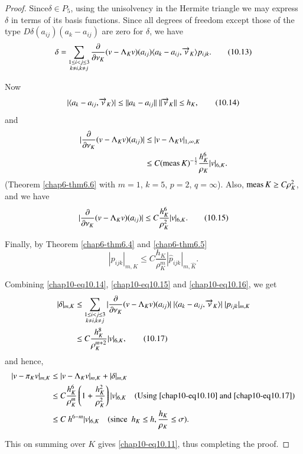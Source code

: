 \begin{proof}
Since\pageoriginale $\delta\in P_{5}$, using the unisolvency in the
Hermite triangle we may express $\delta$ in terms of its basis
functions. Since all degrees of freedom except those of the type
$D\delta(a_{ij})(a_{k}-a_{ij})$ are zero for $\delta$, we have
\begin{equation*}
\delta=\sum_{\substack{1\leq i<j\leq 3\\ k\neq i, k\neq
    j}}\frac{\partial}{\partial \nu_{K}}(v-\Lambda_{K}v)(a_{ij})\langle
a_{k}-a_{ij},\overrightarrow{\nu}_{K}\rangle p_{ijk}.\tag{10.13}\label{chap10-eq10.13}
\end{equation*}

Now 
\begin{equation*}
|\langle a_{k}-a_{ij},\overrightarrow{\nu}_{K}\rangle |\leq
||a_{k}-a_{ij}||~||\overrightarrow{\nu}_{K}||\leq h_{K},\tag{10.14}\label{chap10-eq10.14}
\end{equation*}
and
\begin{align*}
|\frac{\partial}{\partial \nu_{K}}(v-\Lambda_{K}v)(a_{ij})| &\leq
|v-\Lambda_{K}v|_{1,\infty,K}\\ 
&\leq C(\operatorname{meas} K)^{-\frac{1}{2}}\frac{h^{6}_{K}}{\rho_{K}}|v|_{6,K}. 
\end{align*}
(Theorem \ref{chap6-thm6.6} with $m=1$, $k=5$, $p=2$,
$q=\infty$). Also, $\operatorname{meas} K\geq C\rho^{2}_{K}$, and we have
\begin{equation*}
|\frac{\partial}{\partial \nu_{K}}(v-\Lambda_{K}v)(a_{ij})|\leq
C\frac{h^{6}_{K}}{\rho^{2}_{K}}|v|_{6,K}.\tag{10.15}\label{chap10-eq10.15} 
\end{equation*}

Finally, by Theorem \ref{chap6-thm6.4} and \ref{chap6-thm6.5}
\begin{equation*}
|p_{ijk}|_{m,K}\leq
C\frac{h_{K}}{\rho^{m}_{K}}|\hat{p}_{ijk}|_{m,\hat{K}}.\tag{10.16}\label{chap10-eq10.16} 
\end{equation*}

Combining \eqref{chap10-eq10.14}, \eqref{chap10-eq10.15} and
\eqref{chap10-eq10.16}, we get
\begin{align*}
|\delta|_{m,K} &\leq \sum_{\substack{1\leq i<j\leq 3\\ k\neq i, k\neq
    j}} |\frac{\partial}{\partial \nu_{K}}(v-\Lambda_{K}v)(a_{ij})|~|\langle
a_{k}-a_{ij},\overrightarrow{\nu}_{K}\rangle|~|p_{ijk}|_{m,K}\\
&\leq C\frac{h^{8}_{K}}{\rho^{m+2}_{K}}|v|_{6,K},
\tag{10.17}\label{chap10-eq10.17} 
\end{align*}
and hence, 
\begin{align*}
|v-\pi_{K}v|_{m,K} &\leq |v-\Lambda_{K}v|_{m,K}+|\delta|_{m,K}\\
&\leq
C\frac{h^{6}_{K}}{\rho^{m}_{K}}\left(1+\frac{h^{2}_{K}}{\rho^{2}_{K}}\right)|v|_{6,K}\quad\text{(Using
  \eqref{chap10-eq10.10} and \eqref{chap10-eq10.17})}\\
&\leq C\ h^{6-m}|v|_{6,K}\quad(\text{since~ } h_{K}\leq h,
\frac{h_{K}}{\rho_{K}}\leq \sigma). 
\end{align*}\pageoriginale

This on summing over $K$ gives \eqref{chap10-eq10.11}, thus completing
the proof.
\end{proof}


